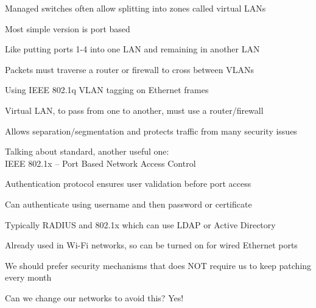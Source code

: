 \documentclass[Screen16to9,17pt]{foils}
\begin{document}
\begin{list1}
\item Managed switches often allow splitting into zones called virtual LANs
\item Most simple version is port based
\item Like putting ports 1-4 into one LAN and remaining in another LAN
\item Packets must traverse a router or firewall to cross between VLANs
\end{list1}



\begin{list1}
\item Using IEEE 802.1q  VLAN tagging on Ethernet frames
\item Virtual LAN, to pass from one to another, must use a router/firewall
\item Allows separation/segmentation and protects traffic from many security issues
\end{list1}


Talking about standard, another useful one:\\
IEEE 802.1x -- Port Based Network Access Control


\begin{list1}
\item Authentication protocol ensures user validation before port access
\item Can authenticate using username and then password or certificate
\item Typically RADIUS and 802.1x which can use LDAP or Active Directory
\item Already used in Wi-Fi networks, so can be turned on for wired Ethernet ports
\end{list1}





\begin{list2}
\item We should prefer security mechanisms that does NOT require us to keep patching every month
\item Can we change our networks to avoid this? Yes!
\end{list2}
\end{document}
